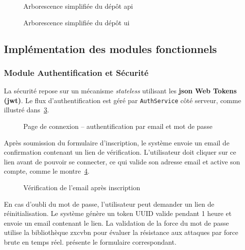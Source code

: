 \begin{figure}[H]
    
    \caption{Arborescence simplifiée du dépôt \acrshort{api}}
    \label{fig:tree-api}
\end{figure}

\begin{figure}[H]
    
    \caption{Arborescence simplifiée du dépôt \acrshort{ui}}
    \label{fig:tree-ui}
\end{figure}

\subsection{Implémentation des modules fonctionnels}
\label{ch4:modules_impl}

\subsubsection{Module Authentification et Sécurité}
\label{ch4:module_auth}

La sécurité repose sur un mécanisme \textit{stateless} utilisant les \textbf{\acrshort{json} Web Tokens (\acrshort{jwt})}. Le flux d'authentification est géré par \texttt{AuthService} côté serveur, comme illustré dans~\cref{fig:login}.

\begin{figure}[H]
    \centering
    \caption{Page de connexion -- authentification par email et mot de passe}
    \label{fig:login}
\end{figure}

Après soumission du formulaire d'inscription, le système envoie un email de confirmation contenant un lien de vérification. L'utilisateur doit cliquer sur ce lien avant de pouvoir se connecter, ce qui valide son adresse email et active son compte, comme le montre~\cref{fig:verify-account}.

\begin{figure}[H]
    \centering
    \caption{Vérification de l'email après inscription}
    \label{fig:verify-account}
\end{figure}

En cas d'oubli du mot de passe, l'utilisateur peut demander un lien de réinitialisation. Le système génère un token UUID valide pendant 1 heure et envoie un email contenant le lien. La validation de la force du mot de passe utilise la bibliothèque zxcvbn pour évaluer la résistance aux attaques par force brute en temps réel.  présente le formulaire correspondant.

